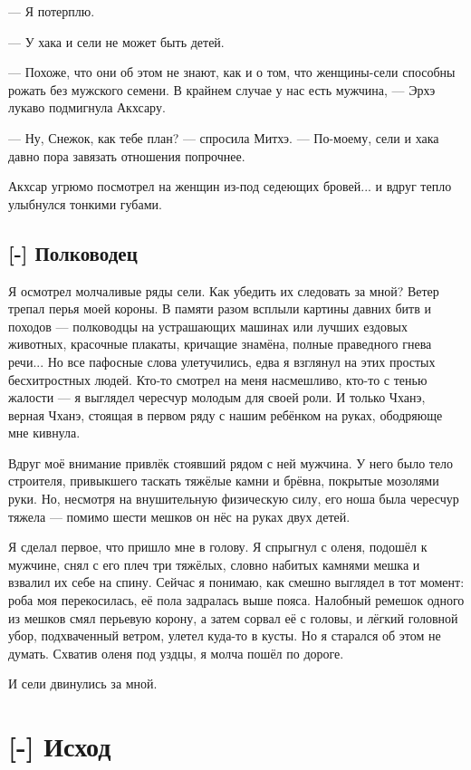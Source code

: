 --- Я потерплю.

--- У хака и сели не может быть детей.

--- Похоже, что они об этом не знают, как и о том, что женщины-сели способны рожать без мужского семени.
В крайнем случае у нас есть мужчина, --- Эрхэ лукаво подмигнула Акхсару.

--- Ну, Снежок, как тебе план? --- спросила Митхэ.
--- По-моему, сели и хака давно пора завязать отношения попрочнее.

Акхсар угрюмо посмотрел на женщин из-под седеющих бровей... и вдруг тепло улыбнулся тонкими губами.

\section{[-] Полководец}

\textspace

Я осмотрел молчаливые ряды сели.
Как убедить их следовать за мной?
Ветер трепал перья моей короны.
В памяти разом всплыли картины давних битв и походов --- полководцы на устрашающих машинах или лучших ездовых животных, красочные плакаты, кричащие знамёна, полные праведного гнева речи...
Но все пафосные слова улетучились, едва я взглянул на этих простых бесхитростных людей.
Кто-то смотрел на меня насмешливо, кто-то с тенью жалости --- я выглядел чересчур молодым для своей роли.
И только Чханэ, верная Чханэ, стоящая в первом ряду с нашим ребёнком на руках, ободряюще мне кивнула.

Вдруг моё внимание привлёк стоявший рядом с ней мужчина.
У него было тело строителя, привыкшего таскать тяжёлые камни и брёвна, покрытые мозолями руки.
Но, несмотря на внушительную физическую силу, его ноша была чересчур тяжела --- помимо шести мешков он нёс на руках двух детей.

Я сделал первое, что пришло мне в голову.
Я спрыгнул с оленя, подошёл к мужчине, снял с его плеч три тяжёлых, словно набитых камнями мешка и взвалил их себе на спину.
Сейчас я понимаю, как смешно выглядел в тот момент: роба моя перекосилась, её пола задралась выше пояса.
Налобный ремешок одного из мешков смял перьевую корону, а затем сорвал её с головы, и лёгкий головной убор, подхваченный ветром, улетел куда-то в кусты.
Но я старался об этом не думать.
Схватив оленя под уздцы, я молча пошёл по дороге.

И сели двинулись за мной.

\chapter{[-] Исход}

